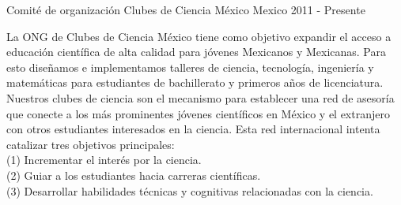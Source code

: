 

\begin{cventries}

  \cventry
    {Comité de organización} %
    {Clubes de Ciencia México} %
    {Mexico} %
    {2011 - Presente} %
    {
      \begin{cvitems} %
        \item {La ONG de Clubes de Ciencia México tiene como objetivo expandir
        el acceso a educación científica de alta calidad para  jóvenes Mexicanos 
        y Mexicanas. Para esto diseñamos e implementamos talleres de ciencia,
        tecnología, ingeniería y matemáticas para estudiantes de bachillerato
        y primeros años de licenciatura. Nuestros clubes de ciencia son el 
        mecanismo para establecer una red de asesoría que conecte a los más
        prominentes jóvenes científicos en México y el extranjero con otros
        estudiantes interesados en la ciencia. Esta red internacional intenta
        catalizar tres objetivos principales:\\
        (1) Incrementar el interés por la ciencia.\\
        (2) Guiar a los estudiantes hacia carreras científicas.\\
        (3) Desarrollar habilidades técnicas y cognitivas relacionadas con la
        ciencia.}
      \end{cvitems}
    }
\end{cventries}
